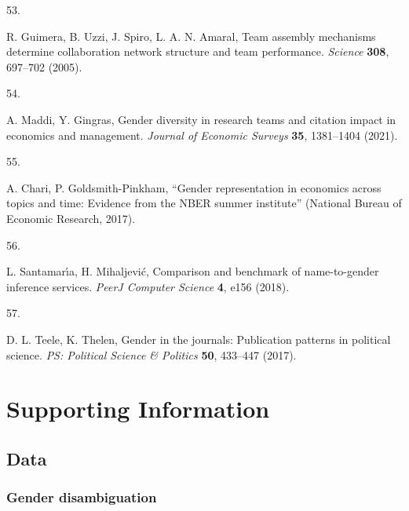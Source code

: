 \documentclass[
  british,
  12pt, %
]{article}
\newlength{\cslhangindent}
\newlength{\csllabelwidth}
\newenvironment{CSLReferences}[2] %
 {\begin{list}{}{%
  \setlength{\itemindent}{0pt}
  \setlength{\leftmargin}{0pt}
  \setlength{\parsep}{0pt}
  \ifodd #1
   \setlength{\leftmargin}{\cslhangindent}
   \setlength{\itemindent}{-1\cslhangindent}
  \fi
  \setlength{\itemsep}{#2\baselineskip}}}
 {\end{list}}
\newcommand{\CSLLeftMargin}[1]{\parbox[t]{\csllabelwidth}{\strut#1\strut}}
\newcommand{\CSLRightInline}[1]{\parbox[t]{\linewidth - \csllabelwidth}{\strut#1\strut}}
\begin{document}
\begin{CSLReferences}{0}{1}
\CSLLeftMargin{53. }%
\CSLRightInline{R. Guimera, B. Uzzi, J. Spiro, L. A. N. Amaral, Team assembly mechanisms determine collaboration network structure and team performance. \emph{Science} \textbf{308}, 697--702 (2005).}

\CSLLeftMargin{54. }%
\CSLRightInline{A. Maddi, Y. Gingras, Gender diversity in research teams and citation impact in economics and management. \emph{Journal of Economic Surveys} \textbf{35}, 1381--1404 (2021).}

\CSLLeftMargin{55. }%
\CSLRightInline{A. Chari, P. Goldsmith-Pinkham, {``Gender representation in economics across topics and time: Evidence from the NBER summer institute''} (National Bureau of Economic Research, 2017).}

\CSLLeftMargin{56. }%
\CSLRightInline{L. Santamarı́a, H. Mihaljević, Comparison and benchmark of name-to-gender inference services. \emph{PeerJ Computer Science} \textbf{4}, e156 (2018).}

\CSLLeftMargin{57. }%
\CSLRightInline{D. L. Teele, K. Thelen, Gender in the journals: Publication patterns in political science. \emph{PS: Political Science \& Politics} \textbf{50}, 433--447 (2017).}

\end{CSLReferences}

\newpage
\appendix
\renewcommand{\thefigure}{SI-\arabic{figure}}
\renewcommand{\thesection}{SI}
\renewcommand{\thesubsection}{SI-\arabic{subsection}}

\setcounter{figure}{0}
\setcounter{table}{0}
\setcounter{section}{0}
\setcounter{subsection}{0}
\renewcommand{\thetable}{SI-\arabic{table}}

\section{Supporting Information}\label{supporting-information}

\subsection{Data}\label{data}

\subsubsection{Gender disambiguation}\label{gender-disambiguation}
\end{document}
